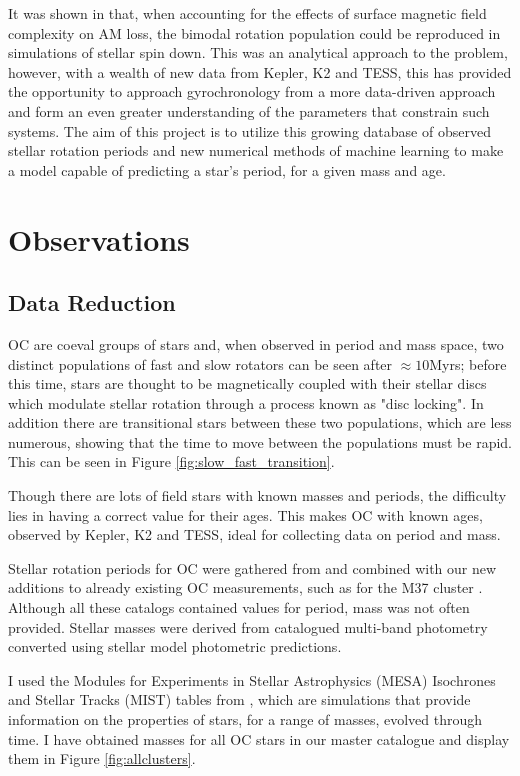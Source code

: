 \documentclass[fleqn,usenatbib]{mnras}
\begin{document}
It was shown in \cite{Garraffo_2018} that, when accounting for the effects of surface magnetic field complexity on AM loss, the bimodal rotation population could be reproduced in simulations of stellar spin down.
This was an analytical approach to the problem, however, with a wealth of new data from Kepler, K2 and TESS, this has provided the opportunity to approach gyrochronology from a more data-driven approach and form an even greater understanding of the parameters that constrain such systems.
The aim of this project is to utilize this growing database of observed stellar rotation periods and new numerical methods of machine learning to make a model capable of predicting a star's period, for a given mass and age.

\section{Observations}
\subsection{Data Reduction}
OC are coeval groups of stars and, when observed in period and mass space, two distinct populations of fast and slow rotators can be seen after $\approx 10$Myrs; before this time, stars are thought to be magnetically coupled with their stellar discs which modulate stellar rotation through a process known as "disc locking". 
In addition there are  transitional stars between these two populations, which are less numerous, showing that the time to move between the populations must be rapid.
This can be seen in Figure \ref{fig:slow_fast_transition}.

Though there are lots of field stars with known masses and periods, the difficulty lies in having a correct value for their ages.
This makes OC with known ages, observed by Kepler, K2 and TESS, ideal for collecting data on period and mass.

Stellar rotation periods for OC were gathered from \cite{beuther2014protostars} and combined with our new additions to already existing OC measurements, such as for the M37 cluster \cite{chang}.
Although all these catalogs contained values for period, mass was not often provided.
Stellar masses were derived from catalogued multi-band photometry converted using stellar model photometric predictions. 

I used the Modules for Experiments in Stellar Astrophysics (MESA) Isochrones and Stellar Tracks (MIST) tables from \cite{Choi_2016}, which are simulations that provide information on the properties of stars, for a range of masses, evolved through time.
I have obtained masses for all OC stars in our master catalogue and display them in Figure \ref{fig:allclusters}.
\end{document}
